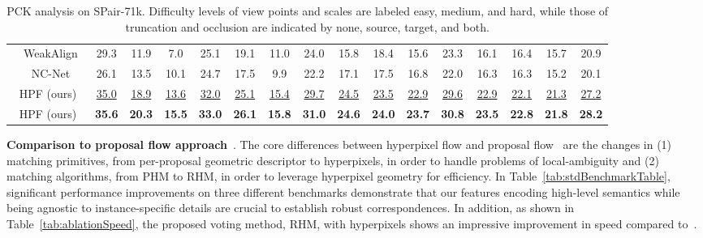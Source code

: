 \documentclass[10pt,twocolumn,letterpaper]{article}
\begin{document}
\begin{center}
\begin{table*}
\begin{center}
{\begin{tabular}{c|c|ccc|ccc|cccc|cccc|c}
            & WeakAlign~\cite{Rocco18}             & 29.3 & 11.9 & 7.0 & 25.1 & 19.1 & 11.0 & 24.0 & 15.8 & 18.4 & 15.6 & 23.3 & 16.1 & 16.4 & 15.7 & 20.9 \\ 
            & NC-Net~\cite{rocco2018neighbourhood} & 26.1 & 13.5 & 10.1 & 24.7 & 17.5 & 9.9 & 22.2 & 17.1 & 17.5 & 16.8 & 22.0 & 16.3 & 16.3 & 15.2 & 20.1 \\ 
\hline
            \multicolumn{2}{c|}{HPF (ours)} & \underline{35.0} & \underline{18.9} & \underline{13.6} & \underline{32.0} & \underline{25.1} & \underline{15.4} & \underline{29.7} & \underline{24.5} & \underline{23.5} & \underline{22.9} & \underline{29.6} & \underline{22.9} & \underline{22.1} & \underline{21.3} & \underline{27.2} \\
            \multicolumn{2}{c|}{HPF (ours)} & \textbf{35.6} & \textbf{20.3} & \textbf{15.5} & \textbf{33.0} & \textbf{26.1} & \textbf{15.8} & \textbf{31.0} & \textbf{24.6} & \textbf{24.0} & \textbf{23.7} & \textbf{30.8} & \textbf{23.5} & \textbf{22.8} &  \textbf{21.8} & \textbf{28.2}   \\
            \hline
            \end{tabular}}
        \vspace{-2.0mm}
        \caption{\label{tab:HPFanalysesTable} PCK analysis on SPair-71k. Difficulty levels of view points and scales are labeled easy, medium, and hard, while those of truncation and occlusion are indicated by none, source, target, and both.} 
\vspace{-4.0mm}
        \end{center}
    \end{table*}
\end{center}

\smallbreak
\noindent \textbf{Comparison to proposal flow approach}~\cite{ham2016proposal}. The core differences between hyperpixel flow and proposal flow~\cite{ham2016proposal} are the changes in (1) matching primitives, from per-proposal geometric descriptor to hyperpixels, in order to handle problems of local-ambiguity and (2) matching algorithms, from PHM to RHM, in order to leverage hyperpixel geometry for efficiency. In Table~\ref{tab:stdBenchmarkTable}, significant performance improvements on three different benchmarks demonstrate that our features encoding high-level semantics while being agnostic to instance-specific details are crucial to establish robust correspondences. In addition, as shown in Table~\ref{tab:ablationSpeed}, the proposed voting method, RHM, with hyperpixels shows an impressive improvement in speed compared to~\cite{ham2016proposal}.
 
\end{document}
